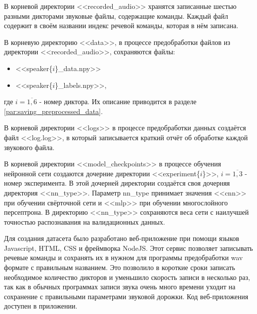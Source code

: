 В корневой директории <<recorded\_audio>> хранятся записанные шестью разными дикторами звуковые файлы, содержащие команды. Каждый файл содержит в своём названии индекс речевой команды, которая в нём записана.

В корневую директорию <<data>>, в процессе предобработки файлов из директории <<recorded\_audio>>, сохраняются файлы:
\begin{itemize}[leftmargin=2cm]
	\item <<speaker\{$i$\}\_data.npy>>\footnotemark 
	\item <<speaker\{$i$\}\_labels.npy>>\footnotemark[\value{footnote}],
\end{itemize}
где  $i=\overline{1,6}$ - номер диктора. Их описание приводится в разделе \ref{par:saving_preprocessed_data}.

В корневой директории <<logs>> в процессе предобработки данных создаётся файл <<log.log>>, в который записывается краткий отчёт об обработке каждой звукового файла.

В корневой директории <<model\_checkpoints>> в процессе обучения нейронной сети создаются дочерние директории <<experiment\{$i$\}>>\footnotemark[\value{footnote}], $i=\overline{1,3}$ - номер эксперимента. В этой дочерней директории создаётся своя дочерняя директория <<{nn\_type}>>. Параметр nn\_type принимает  значения <<cnn>> при обучении свёрточной сети и <<mlp>> при обучении многослойного персептрона. В директорию <<{nn\_type}>> сохраняются веса сети с наилучшей точностью распознавания на валидационных данных.


Для создания датасета было разработано веб-приложение при помощи языков Javascript, HTML, CSS и фреймворка NodeJS. Этот сервис позволяет записывать речевые команды и сохранять их в нужном для программы предобработки wav формате с правильным названием. Это позволило в короткие сроки записать необходимое количество дикторов и уменьшило скорость записи в несколько раз, так как в обычных программах записи звука очень много времени уходит на сохранение с правильными параметрами звуковой дорожки. Код веб-приложения доступен в приложении.

